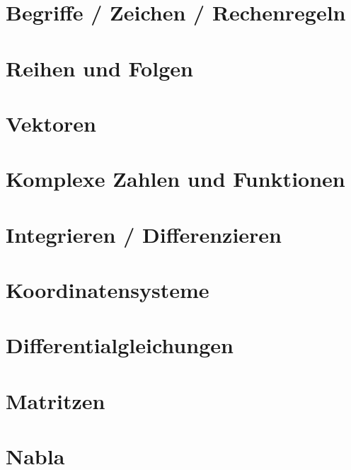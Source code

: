 \documentclass[final, 11pt]{article}
\begin{document}
  

\section{Begriffe / Zeichen / Rechenregeln}  


\section{Reihen und Folgen}


\section{Vektoren}


\section{Komplexe Zahlen und Funktionen}


\section{Integrieren / Differenzieren}


\section{Koordinatensysteme}


\section{Differentialgleichungen}


\newpage
\section{Matritzen}


\section{Nabla}


\newpage
\printbibliography{}
\end{document}
